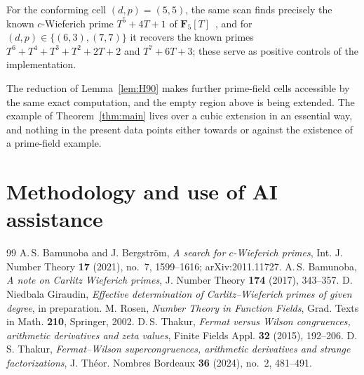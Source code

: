 \documentclass[10pt,a4paper]{amsart}
\newcommand{\F}{\mathbf{F}}
\begin{document}
For the conforming cell $(d,p)=(5,5)$, the same scan finds precisely the known
$c$-Wieferich prime $T^5+4T+1$ of $\F_5[T]$~\cite{BB}, and for
$(d,p)\in\{(6,3),(7,7)\}$ it recovers the known primes
$T^6+T^4+T^3+T^2+2T+2$ and $T^7+6T+3$; these serve as positive controls of the
implementation.

The reduction of Lemma~\ref{lem:H90} makes further prime-field cells accessible
by the same exact computation, and the empty region above is being extended.
The example of Theorem~\ref{thm:main} lives over a cubic extension in an
essential way, and nothing in the present data points either towards or against
the existence of a prime-field example.

\section{Methodology and use of AI assistance}\label{sec:method}


\begin{thebibliography}{99}
 A.\,S. Bamunoba and J. Bergstr\"om, \emph{A search for $c$-Wieferich primes}, Int. J. Number Theory \textbf{17} (2021), no.~7, 1599--1616; arXiv:2011.11727.
 A.\,S. Bamunoba, \emph{A note on Carlitz Wieferich primes}, J. Number Theory \textbf{174} (2017), 343--357.
 D. Niedbala Giraudin, \emph{Effective determination of Carlitz--Wieferich primes of given degree}, in preparation.
 M. Rosen, \emph{Number Theory in Function Fields}, Grad. Texts in Math. \textbf{210}, Springer, 2002.
 D.\,S. Thakur, \emph{Fermat versus Wilson congruences, arithmetic derivatives and zeta values}, Finite Fields Appl. \textbf{32} (2015), 192--206.
 D.\,S. Thakur, \emph{Fermat--Wilson supercongruences, arithmetic derivatives and strange factorizations}, J. Th\'eor. Nombres Bordeaux \textbf{36} (2024), no.~2, 481--491.
\end{thebibliography}
\end{document}
